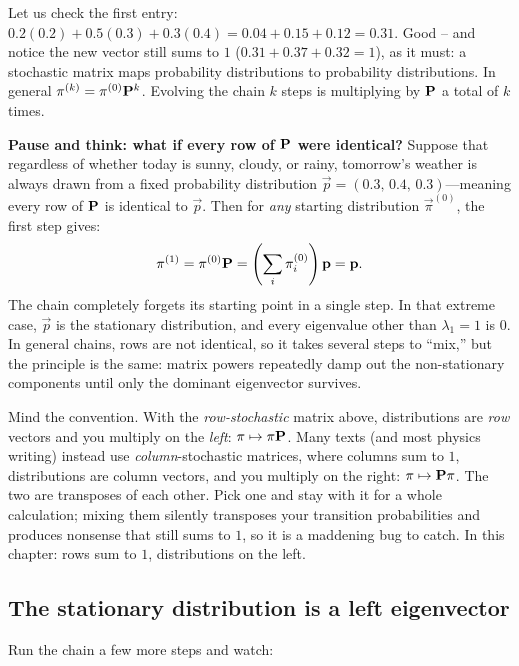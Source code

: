 Let us check the first entry: $0.2(0.2) + 0.5(0.3) + 0.3(0.4) = 0.04 + 0.15 + 0.12 = 0.31$.
Good -- and notice the new vector still sums to $1$ ($0.31+0.37+0.32 = 1$), as it must: a
stochastic matrix maps probability distributions to probability distributions. In general
$\mathbf{\pi}^{(k)} = \mathbf{\pi}^{(0)}\mathbf{P}^k$. Evolving the chain $k$ steps is multiplying by
$\mathbf{P}$ a total of $k$ times.

\begin{recoverybox}
\textbf{Pause and think: what if every row of $\mathbf{P}$ were identical?}
Suppose that regardless of whether today is sunny, cloudy, or rainy, tomorrow's weather is
always drawn from a fixed probability distribution $\vec{p} = (0.3,\,0.4,\,0.3)$---meaning every
row of $\mathbf{P}$ is identical to $\vec{p}$. Then for \emph{any} starting distribution
$\vec{\pi}^{(0)}$, the first step gives:
\[
\mathbf{\pi}^{(1)} = \mathbf{\pi}^{(0)}\mathbf{P} = \left(\sum_i \pi^{(0)}_i\right) \mathbf{p} = \mathbf{p}.
\]
The chain completely forgets its starting point in a single step. In that extreme case,
$\vec{p}$ is the stationary distribution, and every eigenvalue other than $\lambda_1 = 1$ is $0$.
In general chains, rows are not identical, so it takes several steps to ``mix,'' but the
principle is the same: matrix powers repeatedly damp out the non-stationary components until
only the dominant eigenvector survives.
\end{recoverybox}

\begin{trapbox}
Mind the convention. With the \emph{row-stochastic} matrix above, distributions are
\emph{row} vectors and you multiply on the \emph{left}: $\mathbf{\pi} \mapsto \mathbf{\pi}\mathbf{P}$.
Many texts (and most physics writing) instead use \emph{column}-stochastic matrices, where
columns sum to $1$, distributions are column vectors, and you multiply on the right:
$\mathbf{\pi} \mapsto \mathbf{P}\mathbf{\pi}$. The two are transposes of each other. Pick one and stay
with it for a whole calculation; mixing them silently transposes your transition
probabilities and produces nonsense that still sums to $1$, so it is a maddening bug to
catch. In this chapter: rows sum to $1$, distributions on the left.
\end{trapbox}

\subsection{The stationary distribution is a left eigenvector}

Run the chain a few more steps and watch:


